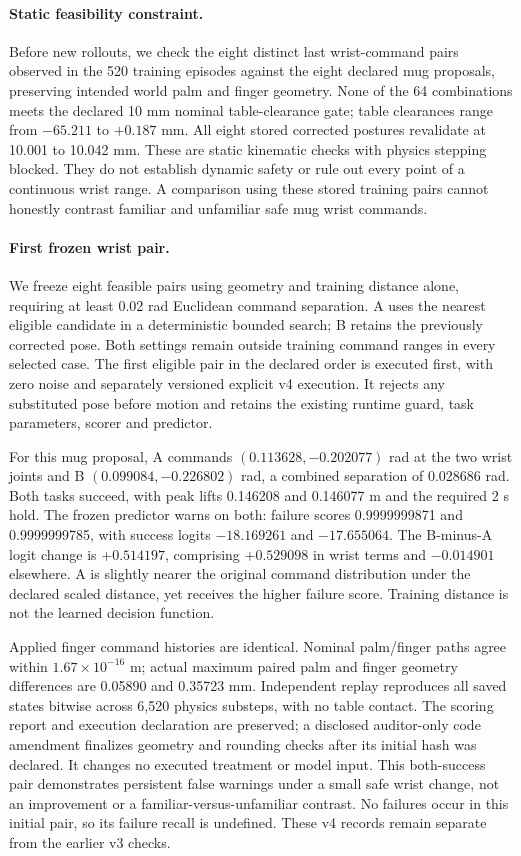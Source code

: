 \documentclass[10pt,letterpaper]{article}
\begin{document}
\paragraph{Static feasibility constraint.}
Before new rollouts, we check the eight distinct last wrist-command pairs
observed in the 520 training episodes against the eight declared mug proposals,
preserving intended world palm and finger geometry. None of the 64 combinations
meets the declared 10 mm nominal table-clearance gate; table clearances range
from $-65.211$ to $+0.187$ mm. All eight stored corrected postures revalidate
at 10.001 to 10.042 mm. These are static kinematic checks with physics stepping
blocked. They do not establish dynamic safety or rule out every point of a
continuous wrist range. A comparison using these stored training pairs cannot
honestly contrast familiar and unfamiliar safe mug wrist commands.

\paragraph{First frozen wrist pair.}
We freeze eight feasible pairs using geometry and training distance alone,
requiring at least 0.02 rad Euclidean command separation. A uses the nearest
eligible candidate in a deterministic bounded search; B retains the previously
corrected pose. Both settings remain outside training command ranges in every
selected case. The first eligible pair in the declared order is executed first,
with zero noise and separately versioned explicit v4 execution. It rejects
any substituted pose before motion and retains the existing runtime guard,
task parameters, scorer and predictor.

For this mug proposal, A commands $(0.113628,-0.202077)$ rad at the two wrist
joints and B $(0.099084,-0.226802)$ rad, a combined separation of 0.028686 rad.
Both tasks succeed, with peak lifts 0.146208 and 0.146077 m and the required
2 s hold. The frozen predictor warns on both: failure scores
0.9999999871 and 0.9999999785, with success logits $-18.169261$ and $-17.655064$.
The B-minus-A logit change is $+0.514197$, comprising $+0.529098$ in wrist terms
and $-0.014901$ elsewhere. A is slightly nearer the original command
distribution under the declared scaled distance, yet receives the higher
failure score. Training distance is not the learned decision function.

Applied finger command histories are identical. Nominal palm/finger paths
agree within $1.67\times10^{-16}$ m; actual maximum paired palm and finger
geometry differences are 0.05890 and 0.35723 mm. Independent replay reproduces
all saved states bitwise across 6,520 physics substeps, with no table contact.
The scoring report and execution declaration are preserved; a disclosed
auditor-only code amendment finalizes geometry and rounding checks after its
initial hash was declared. It changes no executed treatment or model input.
This both-success pair demonstrates persistent false warnings under a small
safe wrist change, not an improvement or a familiar-versus-unfamiliar contrast.
No failures occur in this initial pair, so its failure recall is undefined.
These v4 records remain separate from the earlier v3 checks.
\end{document}
